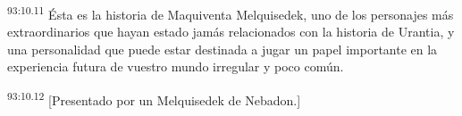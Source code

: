 \par
\textsuperscript{93:10.11} Ésta es la historia de Maquiventa Melquisedek, uno de los personajes más extraordinarios que hayan estado jamás relacionados con la historia de Urantia, y una personalidad que puede estar destinada a jugar un papel importante en la experiencia futura de vuestro mundo irregular y poco común.

\par
\textsuperscript{93:10.12} [Presentado por un Melquisedek de Nebadon.]